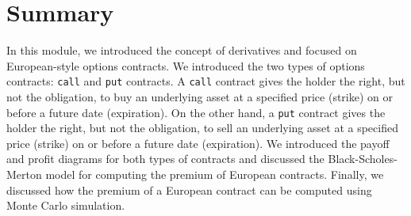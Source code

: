 \documentclass[11pt]{article}
\theoremstyle{definition}
\begin{document}
\section*{Summary}
In this module, we introduced the concept of derivatives and focused on European-style options contracts.
We introduced the two types of options contracts: \texttt{call} and \texttt{put} contracts.
A \texttt{call} contract gives the holder the right, but not the obligation, to buy an underlying asset at a specified price (strike) on or before a future date (expiration).
On the other hand, a \texttt{put} contract gives the holder the right, but not the obligation, to sell an underlying asset at a specified price (strike) on or before a future date (expiration).
We introduced the payoff and profit diagrams for both types of contracts and discussed the Black-Scholes-Merton model for computing the premium of European contracts.
Finally, we discussed how the premium of a European contract can be computed using Monte Carlo simulation.



\clearpage
\printindex
\end{document}
